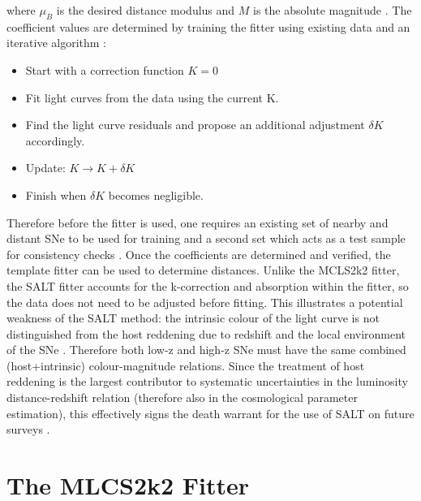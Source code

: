 where $\mu_B$ is the desired distance modulus and $M$ is the absolute magnitude \cite{Hicken2009}. The coefficient values are determined by training the fitter using existing data and an iterative algorithm \cite{Guy2005}:

\begin{itemize}
    \item Start with a correction function $K = 0$
    \item Fit light curves from the data using the current K.
    \item Find the light curve residuals and propose an additional adjustment $\delta{}K$ accordingly.
    \item Update: $K \rightarrow{} K + \delta{}K$
    \item Finish when $\delta{}K$ becomes negligible.
\end{itemize}

Therefore before the fitter is used, one requires an existing set of nearby and distant SNe to be used for training and a second set which acts as a test sample for consistency checks \cite{Guy2005}. Once the coefficients are determined and verified, the template fitter can be used to determine distances. Unlike the MCLS2k2 fitter, the SALT fitter accounts for the k-correction and absorption within the fitter, so the data does not need to be adjusted before fitting. This illustrates a potential weakness of the SALT method: the intrinsic colour of the light curve is not distinguished from the host reddening due to redshift and the local environment of the SNe \cite{Hicken2009}. Therefore both low-z and high-z SNe must have the same combined (host+intrinsic) colour-magnitude relations. Since the treatment of host reddening is the largest contributor to systematic uncertainties in the luminosity distance-redshift relation (therefore also in the cosmological parameter estimation), this effectively signs the death warrant for the use of SALT on future surveys \cite{Leibundgut2008}.

\section{The MLCS2k2 Fitter}
\label{sec:C.3}

